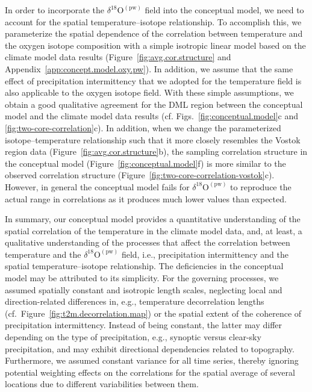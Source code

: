 \documentclass[draft]{agujournal2019}
\begin{document}
In order to incorporate the $\delta^{18}\mathrm{O}^{\mathrm{(pw)}}$ field into
the conceptual model, we need to account for the spatial temperature--isotope
relationship. To accomplish this, we parameterize the spatial dependence of the
correlation between temperature and the oxygen isotope composition with a simple
isotropic linear model based on the climate model data results
(Figure~\ref{fig:avg.cor.structure} and
Appendix~\ref{app:concept.model.oxy.pw}). In addition, we assume that the same
effect of precipitation intermittency that we adopted for the temperature field
is also applicable to the oxygen isotope field. With these simple assumptions,
we obtain a good qualitative agreement for the DML region between the conceptual
model and the climate model data results (cf. Figs.~\ref{fig:conceptual.model}c
and \ref{fig:two-core-correlation}c). In addition, when we change the
parameterized isotope--temperature relationship such that it more closely
resembles the Vostok region data (Figure~\ref{fig:avg.cor.structure}b), the
sampling correlation structure in the conceptual model
(Figure~\ref{fig:conceptual.model}f) is more similar to the observed correlation
structure (Figure~\ref{fig:two-core-correlation-vostok}c). However, in general the
conceptual model fails for $\delta^{18}\mathrm{O}^{\mathrm{(pw)}}$ to reproduce
the actual range in correlations as it produces much lower values than expected.

In summary, our conceptual model provides a quantitative understanding of the
spatial correlation of the temperature in the climate model data, and, at least,
a qualitative understanding of the processes that affect the correlation between
temperature and the $\delta^{18}\mathrm{O}^{\mathrm{(pw)}}$ field, i.e.,
precipitation intermittency and the spatial temperature--isotope
relationship. The deficiencies in the conceptual model may be attributed to its
simplicity. For the governing processes, we assumed spatially constant and
isotropic length scales, neglecting local and direction-related differences in,
e.g., temperature decorrelation lengths
(cf.~Figure~\ref{fig:t2m.decorrelation.map}) or the spatial extent of the
coherence of precipitation intermittency. Instead of being constant, the latter
may differ depending on the type of precipitation, e.g., synoptic versus
clear-sky precipitation, and may exhibit directional dependencies related to
topography. Furthermore, we assumed constant variance for all time series,
thereby ignoring potential weighting effects on the correlations for the spatial
average of several locations due to different variabilities between them.
\end{document}
